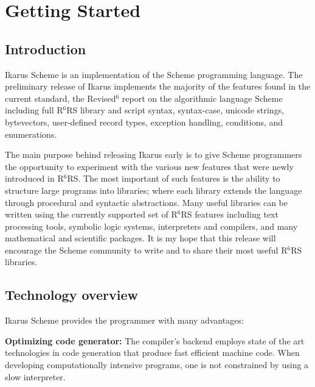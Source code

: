 \documentclass[onecolumn, 12pt, twoside, openright, dvipdfm]{book}
\newcommand{\rnrs}[1]{R$^{\mathrm{#1}}$RS}
\begin{document}
\newpage

\pagestyle{fancy}
{}
\tableofcontents

\newpage

\mainmatter
\setlength{\parindent}{0pt} 
\setlength{\parskip}{2.0ex plus 0ex minus 0ex}
\chapter{Getting Started}
\section{Introduction}

Ikarus Scheme is an implementation of the Scheme programming
language.  The preliminary release of Ikarus implements the majority
of the features found in the current standard, the
Revised$^\mathrm{6}$ report on the algorithmic language
Scheme\cite{r6rs} including full \rnrs{6} library and script syntax,
syntax-case, unicode strings, bytevectors, user-defined record
types, exception handling, conditions, and enumerations.


The main purpose behind releasing Ikarus early is to give Scheme
programmers the opportunity to experiment with the various new
features that were newly introduced in \rnrs{6}.  The most important
of such features is the ability to structure large programs into
libraries; where each library extends the language through
procedural and syntactic abstractions.  Many useful libraries can be
written using the currently supported set of \rnrs{6} features
including text processing tools, symbolic logic systems,
interpreters and compilers, and many mathematical and scientific
packages.  It is my hope that this release will encourage the
Scheme community to write and to share their most useful \rnrs{6}
libraries.


\newpage

\section{Technology overview}

Ikarus Scheme provides the programmer with many advantages:

\textbf{Optimizing code generator:}  The compiler's backend employs
state of the art technologies in code generation that produce fast
efficient machine code.  When developing computationally intensive
programs, one is not constrained by using a slow interpreter.
\end{document}

